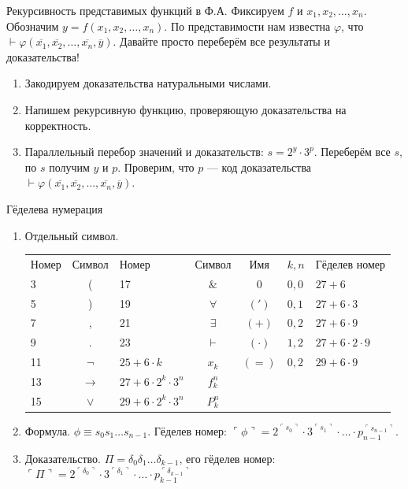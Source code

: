 \documentclass[aspectratio=169]{beamer}
\begin{document}
\begin{frame}{Рекурсивность представимых функций в Ф.А.}
Фиксируем $f$ и $x_1, x_2, \dots, x_n$. Обозначим $y = f(x_1,x_2,\dots,x_n)$. \pause
По представимости нам известна $\varphi$, что $\vdash \varphi(\overline{x_1},\overline{x_2},\dots,\overline{x_n},\overline{y})$. \pause
Давайте просто переберём все результаты и доказательства!\pause

\begin{enumerate}
\item Закодируем доказательства натуральными числами.\pause
\item Напишем рекурсивную функцию, проверяющую доказательства на корректность.\pause
\item Параллельный перебор значений и доказательств: $s = 2^y \cdot 3^p$. Переберём все $s$, по $s$ получим $y$ и $p$.
Проверим, что $p$ --- код доказательства $\vdash \varphi(\overline{x_1},\overline{x_2},\dots,\overline{x_n},\overline{y})$.
\end{enumerate}
\end{frame}

\begin{frame}{Гёделева нумерация}

\begin{enumerate}
\item Отдельный символ.\vspace{0.2cm}

\begin{tabular}{lc|lc||cll}
Номер & Символ & Номер & Символ & Имя & $k,n$ & Гёделев номер\\
3 & ( &               17 & $\&$ &  0 & $0,0$ & $27 + 6$\\
5 & ) &               19 & $\forall$ & $(')$ & $0,1$ & $27 + 6 \cdot 3$\\
7 & , &               21 & $\exists$ & $(+)$ & $0,2$ & $27 + 6 \cdot 9$\\
9 & . &               23 & $\vdash$ & $(\cdot)$ & $1,2$ & $27 + 6 \cdot 2 \cdot 9$\\
11 & $\neg$ &         $25 + 6\cdot k$ & $x_k$ & $(=)$ & $0,2$ & $29 + 6 \cdot 9$\\
13 & $\rightarrow$ &  $27 + 6\cdot 2^k \cdot 3^n$ & $f_k^n$\\
15 & $\vee$ &         $29 + 6\cdot 2^k \cdot 3^n$ & $P_k^n$ 
\end{tabular}\pause

\item Формула. $\phi \equiv s_0s_1\dots s_{n-1}$. Гёделев номер: $\ulcorner\phi\urcorner = 2^{\ulcorner s_0\urcorner}\cdot 3^{\ulcorner s_1\urcorner} 
\cdot \dots \cdot p_{n-1}^{\ulcorner s_{n-1}\urcorner}$.\pause

\item Доказательство. $\Pi = \delta_0\delta_1\dots\delta_{k-1}$, его гёделев номер: $\ulcorner\Pi\urcorner =
2^{\ulcorner \delta_0\urcorner}\cdot 3^{\ulcorner \delta_1\urcorner} \cdot \dots \cdot p_{k-1}^{\ulcorner \delta_{k-1}\urcorner}$
\end{enumerate}
\end{frame}
\end{document}
